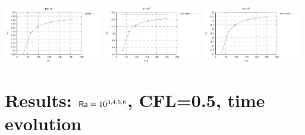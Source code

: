 \begin{center}
\includegraphics[width=4.297cm]{python_codes/fieldstone_155/results_SS/Nu10000}
\includegraphics[width=4.297cm]{python_codes/fieldstone_155/results_SS/Nu100000}
\includegraphics[width=4.297cm]{python_codes/fieldstone_155/results_SS/Nu1000000}
\end{center}



\newpage
\section*{Results: ${\mathsf{Ra}}=10^{3,4,5,6}$, CFL=0.5, time evolution}


